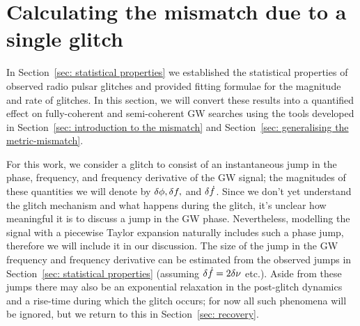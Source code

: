 \documentclass[../full_thesis/full_thesis.tex]{subfiles}
\begin{document}
\section{Calculating the mismatch due to a single glitch}
\label{sec: mismatch due to glitches}

In Section~\ref{sec: statistical properties} we established the statistical
properties of observed radio pulsar glitches and provided fitting formulae for the
magnitude and rate of glitches. In this section, we will convert these
results into a quantified effect on fully-coherent and semi-coherent
GW searches using the tools developed in Section~\ref{sec: introduction to the
mismatch} and Section~\ref{sec: generalising the metric-mismatch}.

For this work, we consider a glitch to consist of an instantaneous jump in the
phase, frequency, and frequency derivative of the GW signal; the magnitudes of
these quantities we will denote by $\delta\phi, \delta f,$ and
$\delta\dot{f}$.  Since we don't yet understand the glitch mechanism and what
happens during the glitch, it's unclear how meaningful it is to discuss a jump
in the GW phase.  Nevertheless, modelling the signal with a piecewise Taylor
expansion naturally includes such a phase jump, therefore we will include it in
our discussion.  The size of the jump in the GW frequency and frequency
derivative can be estimated from the observed jumps in Section~\ref{sec:
statistical properties} (assuming $\delta\dot{f} = 2\delta\nu$ etc.). Aside
from these jumps there may also be an exponential relaxation in the post-glitch
dynamics and a rise-time during which the glitch occurs; for now all such
phenomena will be ignored, but we return to this in Section~\ref{sec: recovery}.
\end{document}
